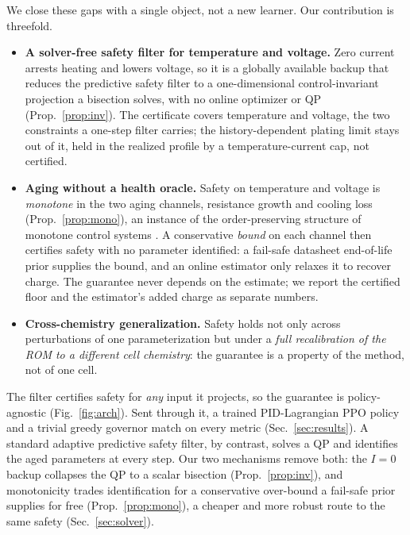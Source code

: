 \documentclass[conference]{IEEEtran}
\begin{document}
We close these gaps with a single object, not a new learner. Our
contribution is threefold.
\begin{itemize}
\item \textbf{A solver-free safety filter for temperature and voltage.} Zero current arrests heating
and lowers voltage, so it is a globally available backup that reduces the predictive safety filter
\cite{wabersich2021psf} to a one-dimensional control-invariant projection a bisection solves, with no
online optimizer or QP (Prop.~\ref{prop:inv}). The certificate covers temperature and voltage, the two
constraints a one-step filter carries; the history-dependent plating limit stays out of it, held in
the realized profile by a temperature-current cap, not certified.
\item \textbf{Aging without a health oracle.} Safety on temperature and voltage is \emph{monotone} in
the two aging channels, resistance growth and cooling loss (Prop.~\ref{prop:mono}), an instance of the
order-preserving structure of monotone control systems \cite{angeli2003monotone,coogan2015mixed}. A
conservative \emph{bound} on each channel then certifies safety with no parameter identified: a
fail-safe datasheet end-of-life prior supplies the bound, and an online estimator only relaxes it to
recover charge. The guarantee never depends on the estimate; we report the certified floor and the
estimator's added charge as separate numbers.
\item \textbf{Cross-chemistry generalization.} Safety holds not only across perturbations of one
parameterization but under a \emph{full recalibration of the ROM to a different cell chemistry}: the
guarantee is a property of the method, not of one cell.
\end{itemize}
The filter certifies safety for \emph{any} input it projects, so the guarantee is policy-agnostic
(Fig.~\ref{fig:arch}). Sent through it, a trained PID-Lagrangian PPO policy and a trivial greedy
governor match on every metric (Sec.~\ref{sec:results}). A standard
adaptive predictive safety filter, by contrast, solves a QP and identifies the aged parameters at
every step. Our two mechanisms remove both: the $I{=}0$ backup collapses the QP to a scalar bisection
(Prop.~\ref{prop:inv}), and monotonicity trades identification for a conservative over-bound a
fail-safe prior supplies for free (Prop.~\ref{prop:mono}), a cheaper and more robust route to the same
safety (Sec.~\ref{sec:solver}).
\end{document}
